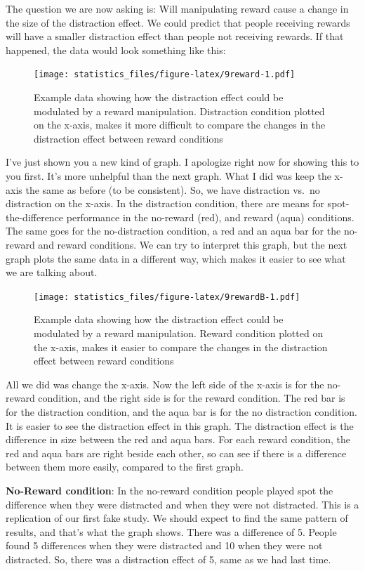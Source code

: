 \documentclass[]{book}
\begin{document}
The question we are now asking is: Will manipulating reward cause a change in the size of the distraction effect. We could predict that people receiving rewards will have a smaller distraction effect than people not receiving rewards. If that happened, the data would look something like this:

\begin{figure}
\centering
\texttt{[image: statistics\_files/figure-latex/9reward-1.pdf]}
\caption{\label{fig:9reward}Example data showing how the distraction effect could be modulated by a reward manipulation. Distraction condition plotted on the x-axis, makes it more difficult to compare the changes in the distraction effect between reward conditions}
\end{figure}

I've just shown you a new kind of graph. I apologize right now for showing this to you first. It's more unhelpful than the next graph. What I did was keep the x-axis the same as before (to be consistent). So, we have distraction vs.~no distraction on the x-axis. In the distraction condition, there are means for spot-the-difference performance in the no-reward (red), and reward (aqua) conditions. The same goes for the no-distraction condition, a red and an aqua bar for the no-reward and reward conditions. We can try to interpret this graph, but the next graph plots the same data in a different way, which makes it easier to see what we are talking about.

\begin{figure}
\centering
\texttt{[image: statistics\_files/figure-latex/9rewardB-1.pdf]}
\caption{\label{fig:9rewardB}Example data showing how the distraction effect could be modulated by a reward manipulation. Reward condition plotted on the x-axis, makes it easier to compare the changes in the distraction effect between reward conditions}
\end{figure}

All we did was change the x-axis. Now the left side of the x-axis is for the no-reward condition, and the right side is for the reward condition. The red bar is for the distraction condition, and the aqua bar is for the no distraction condition. It is easier to see the distraction effect in this graph. The distraction effect is the difference in size between the red and aqua bars. For each reward condition, the red and aqua bars are right beside each other, so can see if there is a difference between them more easily, compared to the first graph.

\textbf{No-Reward condition}: In the no-reward condition people played spot the difference when they were distracted and when they were not distracted. This is a replication of our first fake study. We should expect to find the same pattern of results, and that's what the graph shows. There was a difference of 5. People found 5 differences when they were distracted and 10 when they were not distracted. So, there was a distraction effect of 5, same as we had last time.
\end{document}
